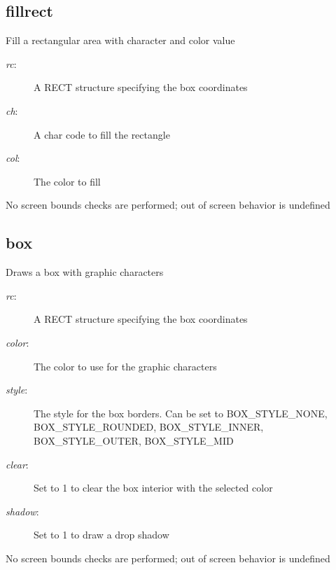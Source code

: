 \subsection{fillrect}
\begin{description}[leftmargin=2cm,style=nextline]
\item [Description:] {Fill a rectangular area with character and color value}
\item [Syntax:] 
\item [Parameters:]
\begin{description}\item[]
\item [{\em rc}:] {A RECT structure specifying the box coordinates}
\item [{\em ch}:] {A char code to fill the rectangle}
\item [{\em col}:] {The color to fill}
\end{description}
\item [Notes:] {No screen bounds checks are performed; out of screen behavior is undefined }
\end{description}

\subsection{box}
\begin{description}[leftmargin=2cm,style=nextline]
\item [Description:] {Draws a box with graphic characters}
\item [Syntax:] 
\item [Parameters:]
\begin{description}\item[]
\item [{\em rc}:] {A RECT structure specifying the box coordinates}
\item [{\em color}:] {The color to use for the graphic characters}
\item [{\em style}:] {The style for the box borders. Can be set to BOX\_STYLE\_NONE, BOX\_STYLE\_ROUNDED, BOX\_STYLE\_INNER, BOX\_STYLE\_OUTER, BOX\_STYLE\_MID }
\item [{\em clear}:] {Set to 1 to clear the box interior with the selected color}
\item [{\em shadow}:] {Set to 1 to draw a drop shadow}
\end{description}
\item [Notes:] {No screen bounds checks are performed; out of screen behavior is undefined }
\end{description}

